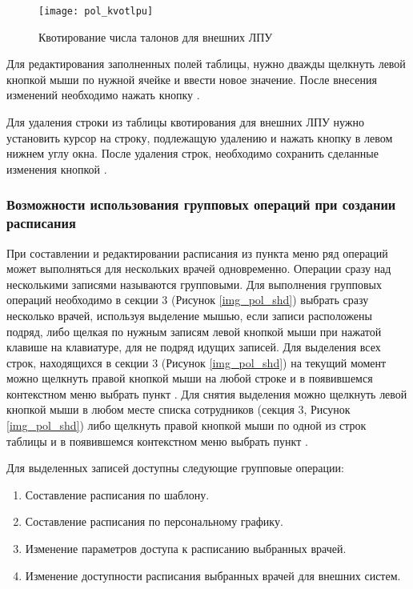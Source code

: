 \begin{figure}[ht]\centering
 \texttt{[image: pol\_kvotlpu]}
 \caption{Квотирование числа талонов для внешних ЛПУ}
 \label{img_pol_kvotlpu}
\end{figure}

Для редактирования заполненных полей таблицы, нужно дважды щелкнуть левой кнопкой мыши по нужной ячейке и ввести новое значение. После внесения изменений необходимо нажать кнопку .

Для удаления строки из таблицы квотирования для внешних ЛПУ нужно установить курсор на строку, подлежащую удалению и нажать кнопку  в левом нижнем углу окна. После удаления строк, необходимо сохранить сделанные изменения кнопкой .

\subsubsection{Возможности использования групповых операций при создании расписания}

При составлении и редактировании расписания из пункта меню  ряд операций может выполняться для нескольких врачей одновременно. Операции сразу над несколькими записями называются групповыми. Для выполнения групповых операций необходимо в секции 3 (Рисунок \ref{img_pol_shd}) выбрать сразу несколько врачей, используя выделение мышью, если записи расположены подряд, либо щелкая по нужным записям левой кнопкой мыши при нажатой клавише  на клавиатуре, для не подряд идущих записей. Для выделения всех строк, находящихся в секции 3 (Рисунок \ref{img_pol_shd}) на текущий момент можно щелкнуть правой кнопкой мыши на любой строке и в появившемся контекстном меню выбрать пункт . Для снятия выделения можно щелкнуть левой кнопкой мыши в любом месте списка сотрудников (секция 3, Рисунок \ref{img_pol_shd}) либо щелкнуть правой кнопкой мыши по одной из строк таблицы и в появившемся контекстном меню выбрать пункт .

Для выделенных записей доступны следующие групповые операции:
\begin{enumerate}
 \item Составление расписания по шаблону.
 \item Составление расписания по персональному графику.
 \item Изменение параметров доступа к расписанию выбранных врачей.
 \item Изменение доступности расписания выбранных врачей для внешних систем.
\end{enumerate}


